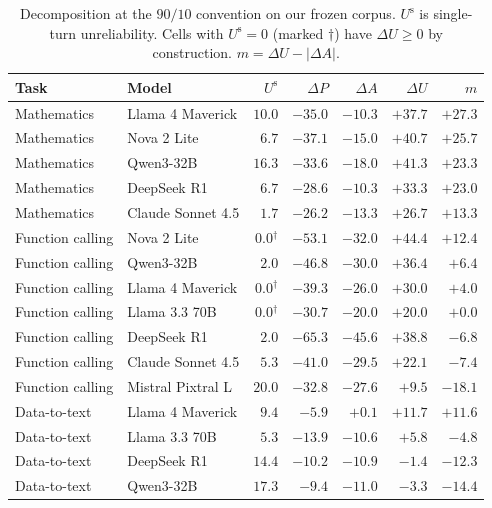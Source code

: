 \documentclass{article}
\begin{document}
\begin{table}[t]
\centering
\caption{Decomposition at the $90/10$ convention on our frozen corpus. $U^{\mathrm{s}}$ is
single-turn unreliability. Cells with $U^{\mathrm{s}} = 0$ (marked $\dagger$) have
$\Delta U \ge 0$ by construction. $m = \Delta U - |\Delta A|$.}
\label{tab:main}
\small
\begin{tabular}{llrrrrr}
\toprule
Task & Model & $U^{\mathrm{s}}$ & $\Delta P$ & $\Delta A$ & $\Delta U$ & $m$\\
\midrule
Mathematics & Llama 4 Maverick & $10.0$ & $-35.0$ & $-10.3$ & $+37.7$ & $+27.3$\\
Mathematics & Nova 2 Lite & $6.7$ & $-37.1$ & $-15.0$ & $+40.7$ & $+25.7$\\
Mathematics & Qwen3-32B & $16.3$ & $-33.6$ & $-18.0$ & $+41.3$ & $+23.3$\\
Mathematics & DeepSeek R1 & $6.7$ & $-28.6$ & $-10.3$ & $+33.3$ & $+23.0$\\
Mathematics & Claude Sonnet 4.5 & $1.7$ & $-26.2$ & $-13.3$ & $+26.7$ & $+13.3$\\
\midrule
Function calling & Nova 2 Lite & $0.0$$^\dagger$ & $-53.1$ & $-32.0$ & $+44.4$ & $+12.4$\\
Function calling & Qwen3-32B & $2.0$ & $-46.8$ & $-30.0$ & $+36.4$ & $+6.4$\\
Function calling & Llama 4 Maverick & $0.0$$^\dagger$ & $-39.3$ & $-26.0$ & $+30.0$ & $+4.0$\\
Function calling & Llama 3.3 70B & $0.0$$^\dagger$ & $-30.7$ & $-20.0$ & $+20.0$ & $+0.0$\\
Function calling & DeepSeek R1 & $2.0$ & $-65.3$ & $-45.6$ & $+38.8$ & $-6.8$\\
Function calling & Claude Sonnet 4.5 & $5.3$ & $-41.0$ & $-29.5$ & $+22.1$ & $-7.4$\\
Function calling & Mistral Pixtral L & $20.0$ & $-32.8$ & $-27.6$ & $+9.5$ & $-18.1$\\
\midrule
Data-to-text & Llama 4 Maverick & $9.4$ & $-5.9$ & $+0.1$ & $+11.7$ & $+11.6$\\
Data-to-text & Llama 3.3 70B & $5.3$ & $-13.9$ & $-10.6$ & $+5.8$ & $-4.8$\\
Data-to-text & DeepSeek R1 & $14.4$ & $-10.2$ & $-10.9$ & $-1.4$ & $-12.3$\\
Data-to-text & Qwen3-32B & $17.3$ & $-9.4$ & $-11.0$ & $-3.3$ & $-14.4$\\
\bottomrule
\end{tabular}
\end{table}
\end{document}
